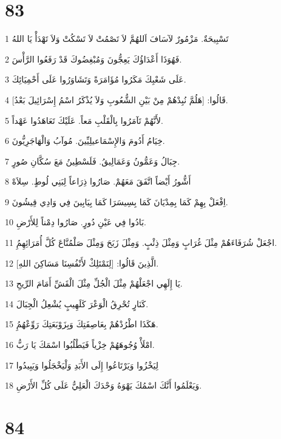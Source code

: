 \chapter{83}

\par 1 تَسْبِيحَةٌ. مَزْمُورٌ لآسَافَ اَللهُمَّ لاَ تَصْمُتْ لاَ تَسْكُتْ وَلاَ تَهْدَأْ يَا اللهُ
\par 2 فَهُوَذَا أَعْدَاؤُكَ يَعِجُّونَ وَمُبْغِضُوكَ قَدْ رَفَعُوا الرَّأْسَ.
\par 3 عَلَى شَعْبِكَ مَكَرُوا مُؤَامَرَةً وَتَشَاوَرُوا عَلَى أَحْمِيَائِكَ.
\par 4 قَالُوا: [هَلُمَّ نُبِدْهُمْ مِنْ بَيْنِ الشُّعُوبِ وَلاَ يُذْكَرُ اسْمُ إِسْرَائِيلَ بَعْدُ].
\par 5 لأَنَّهُمْ تَآمَرُوا بِالْقَلْبِ مَعاً. عَلَيْكَ تَعَاهَدُوا عَهْداً.
\par 6 خِيَامُ أَدُومَ وَالإِسْمَاعيلِيِّينَ. مُوآبُ وَالْهَاجَرِيُّونَ.
\par 7 جِبَالُ وَعَمُّونُ وَعَمَالِيقُ. فَلَسْطِينُ مَعَ سُكَّانِ صُورٍ.
\par 8 أَشُّورُ أَيْضاً اتَّفَقَ مَعَهُمْ. صَارُوا ذِرَاعاً لِبَنِي لُوطٍ. سِلاَهْ
\par 9 اِفْعَلْ بِهِمْ كَمَا بِمِدْيَانَ كَمَا بِسِيسَرَا كَمَا بِيَابِينَ فِي وَادِي قِيشُونَ.
\par 10 بَادُوا فِي عَيْنِ دُورٍ. صَارُوا دِمْناً لِلأَرْضِ.
\par 11 اجْعَلْ شُرَفَاءَهُمْ مِثْلَ غُرَابٍ وَمِثْلَ ذِئْبٍ. وَمِثْلَ زَبَحَ وَمِثْلَ صَلْمُنَّاعَ كُلَّ أُمَرَائِهِمُِ.
\par 12 الَّذِينَ قَالُوا: [لِنَمْتَلِكْ لأَنْفُسِنَا مَسَاكِنَ اللهِ].
\par 13 يَا إِلَهِي اجْعَلْهُمْ مِثْلَ الْجُلِّ مِثْلَ الْقَشِّ أَمَامَ الرِّيحِ.
\par 14 كَنَارٍ تُحْرِقُ الْوَعْرَ كَلَهِيبٍ يُشْعِلُ الْجِبَالَ.
\par 15 هَكَذَا اطْرُدْهُمْ بِعَاصِفَتِكَ وَبِزَوْبَعَتِكَ رَوِّعْهُمُِ.
\par 16 امْلَأْ وُجُوهَهُمْ خِزْياً فَيَطْلُبُوا اسْمَكَ يَا رَبُّ.
\par 17 لِيَخْزُوا وَيَرْتَاعُوا إِلَى الأَبَدِ وَلْيَخْجَلُوا وَيَبِيدُوا
\par 18 وَيَعْلَمُوا أَنَّكَ اسْمُكَ يَهْوَهُ وَحْدَكَ الْعَلِيُّ عَلَى كُلِّ الأَرْضِ.

\chapter{84}

